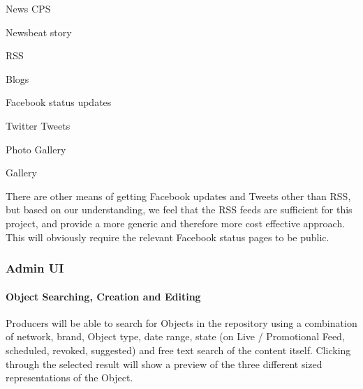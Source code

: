 \documentclass[a4paper, 11pt]{scrreprt}
\begin{document}
\begin{tystrul}
\item News CPS

\begin{tystrul}


\item Newsbeat story

\end{tystrul}



\item RSS

\begin{tystrul}


\item Blogs

\item Facebook status updates

\item Twitter Tweets

\end{tystrul}



\item Photo Gallery

\begin{tystrul}


\item Gallery

\end{tystrul}



\end{tystrul}

There are other means of getting Facebook updates and Tweets other than RSS, but based on our understanding, we feel that the RSS feeds are sufficient for this project, and provide a more generic and therefore more cost effective approach. This will obviously require the relevant Facebook status pages to be public.


\subsubsection{Admin UI}
\label{h.nnvomw29p7ay}

\paragraph{Object Searching, Creation and Editing}
\label{h.ofd8cd43w7p0}
Producers will be able to search for Objects in the repository using a combination of network, brand, Object type, date range, state (on Live / Promotional Feed, scheduled, revoked, suggested) and free text search of the content itself. Clicking through the selected result will show a preview of the three different sized representations of the Object.
\end{document}
